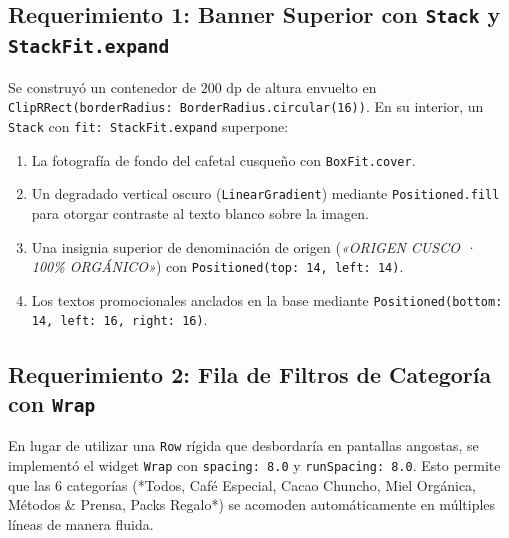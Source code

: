 \documentclass[12pt,a4paper]{article}
\begin{document}
\subsection{Requerimiento 1: Banner Superior con \texttt{Stack} y \texttt{StackFit.expand}}
Se construyó un contenedor de $200\text{ dp}$ de altura envuelto en \texttt{ClipRRect(borderRadius: BorderRadius.circular(16))}. En su interior, un \texttt{Stack} con \texttt{fit: StackFit.expand} superpone:
\begin{enumerate}
    \item La fotografía de fondo del cafetal cusqueño con \texttt{BoxFit.cover}.
    \item Un degradado vertical oscuro (\texttt{LinearGradient}) mediante \texttt{Positioned.fill} para otorgar contraste al texto blanco sobre la imagen.
    \item Una insignia superior de denominación de origen (\textit{«ORIGEN CUSCO · 100\% ORGÁNICO»}) con \texttt{Positioned(top: 14, left: 14)}.
    \item Los textos promocionales anclados en la base mediante \texttt{Positioned(bottom: 14, left: 16, right: 16)}.
\end{enumerate}

\subsection{Requerimiento 2: Fila de Filtros de Categoría con \texttt{Wrap}}
En lugar de utilizar una \texttt{Row} rígida que desbordaría en pantallas angostas, se implementó el widget \texttt{Wrap} con \texttt{spacing: 8.0} y \texttt{runSpacing: 8.0}. Esto permite que las 6 categorías (*Todos, Café Especial, Cacao Chuncho, Miel Orgánica, Métodos \& Prensa, Packs Regalo*) se acomoden automáticamente en múltiples líneas de manera fluida.
\end{document}
